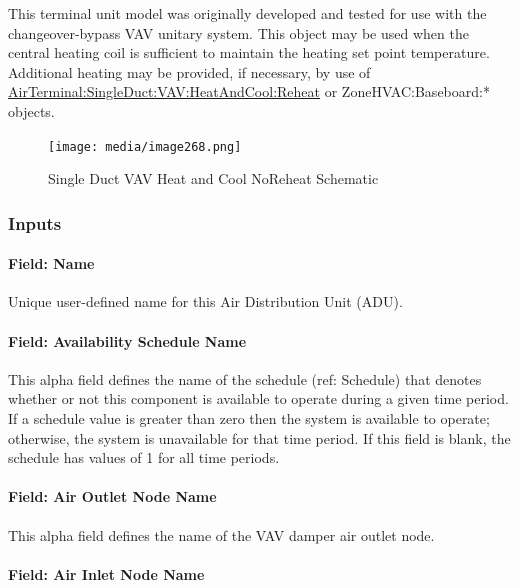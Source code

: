 This terminal unit model was originally developed and tested for use with the changeover-bypass VAV unitary system. This object may be used when the central heating coil is sufficient to maintain the heating set point temperature. Additional heating may be provided, if necessary, by use of \hyperref[airterminalsingleductvavheatandcoolreheat]{AirTerminal:SingleDuct:VAV:HeatAndCool:Reheat} or ZoneHVAC:Baseboard:* objects.

\begin{figure}[hbtp] %
\centering
\texttt{[image: media/image268.png]}
\caption{Single Duct VAV Heat and Cool NoReheat Schematic \protect \label{fig:single-duct-vav-heat-and-cool-noreheat}}
\end{figure}

\subsubsection{Inputs}\label{inputs-6-000}

\paragraph{Field: Name}\label{field-name-6-000}

Unique user-defined name for this Air Distribution Unit (ADU).

\paragraph{Field: Availability Schedule Name}\label{field-availability-schedule-name-6}

This alpha field defines the name of the schedule (ref: Schedule) that denotes whether or not this component is available to operate during a given time period. If a schedule value is greater than zero then the system is available to operate; otherwise, the system is unavailable for that time period. If this field is blank, the schedule has values of 1 for all time periods.

\paragraph{Field: Air Outlet Node Name}\label{field-air-outlet-node-name-5}

This alpha field defines the name of the VAV damper air outlet node.

\paragraph{Field: Air Inlet Node Name}\label{field-air-inlet-node-name-5}

